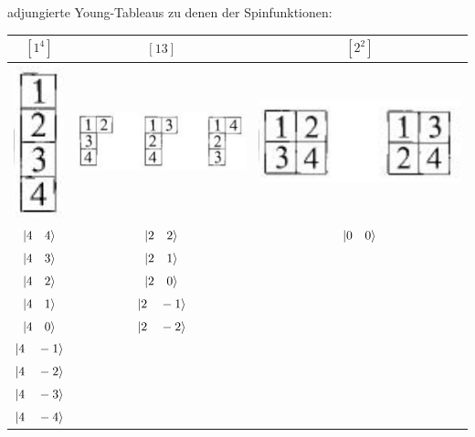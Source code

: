 \documentclass[12pt,a4paper]{article}
\begin{document}
 adjungierte Young-Tableaus zu denen der Spinfunktionen: 
 \begin{table}[H]
\centering
 \begin{tabular}{|c|c|c|}
 \hline 
 $\left[1 ^4\right]$ & $\left[ 1 3\right]$ & $\left[ 2 ^2 \right]$ \\ \hline 
 \includegraphics[scale=0.4]{build/young-1hoch4.png} & 
 \includegraphics[scale=0.4]{build/young-21hoch2.png}
 & \includegraphics[scale=0.2]{build/young-2hoch2.png} \\ \hline 
 $\ket{4\quad 4}$ & $\ket{2\quad 2}$ & $\ket{0 \quad 0}$ \\
 $\ket{4\quad 3}$ & $\ket{2 \quad 1}$ & \\
 $\ket{4 \quad 2}$ & $\ket{2 \quad 0}$ & \\
 $\ket{4\quad 1}$ & $\ket{2 \quad -1}$ & \\
 $\ket{4\quad 0}$ & $\ket{2 \quad -2}$ & \\
 $\ket{4\quad -1}$ & & \\
 $\ket{4 \quad -2}$ & & \\
 $\ket{4 \quad -3}$ & & \\
 $\ket{4\quad -4}$ & & \\  \hline
 \end{tabular}
 \end{table}
 
\end{document}
